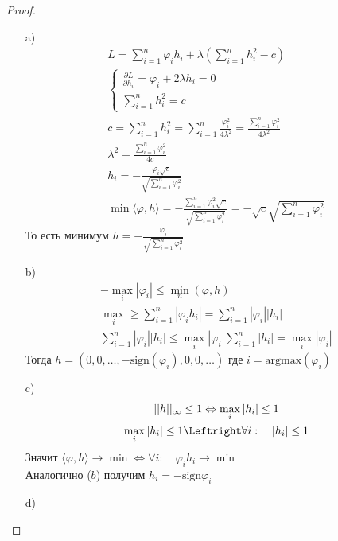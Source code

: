 \begin{proof}
\begin{itemize}
        \item[a)]
            \begin{gather*}
                L = \sum\limits_{i = 1}^{n} \varphi_i h_i + \lambda(\sum\limits_{i = 1}^{n} h_i^2 - c)\\
                \begin{cases}
                    \frac{\partial L}{\partial h_i} = \varphi_i + 2 \lambda h_i = 0\\
                    \sum\limits_{i = 1}^{n} h_i^2 = c
                \end{cases}\\
                c = \sum\limits_{i = 1}^{n} h_i^2
                = \sum\limits_{i = 1}^{n} \frac{\varphi_i^2}{4 \lambda^2}
                = \frac{\sum\limits_{i = 1}^{n} \varphi_i^2}{4 \lambda^2}\\
                \lambda^2 = \frac{\sum\limits_{i = 1}^{n} \varphi_i^2}{4 c}\\
                h_i = -\frac{\varphi_i \sqrt{c}}{\sqrt{\sum\limits_{i = 1}^{n} \varphi_i^2}}\\
                \min \langle \varphi, h \rangle
                = -\frac{\sum\limits_{i=1}^{n}\varphi_i^2 \sqrt{c}}{\sqrt{\sum\limits_{i = 1}^{n} \varphi_i^2}}
                = -\sqrt{c} \sqrt{\sum\limits_{i = 1}^{n} \varphi_i^2}
            \end{gather*}
            То есть минимум $h = -\frac{\varphi_i}{\sqrt{\sum\limits_{i = 1}^{n} \varphi_i^2}}$
        \item[b)]
            \begin{gather*}
                -\max_{i}|\varphi_i| \leq \min_{n}(\varphi, h)\\
                \max_{i} \geq \sum\limits_{i=1}^{n} |\varphi_i h_i|
                = \sum\limits_{i=1}^{n} |\varphi_i||h_i|\\
                \sum\limits_{i=1}^{n} |\varphi_i||h_i|
                \leq \max_{i} |\varphi_i| \sum\limits_{i=1}^{n} |h_i|
                = \max_{i} |\varphi_i|
            \end{gather*}
            Тогда $h = (0,0, \ldots, -\text{sign}(\varphi_i), 0, 0, \ldots)$ где $i = \text{argmax}(\varphi_i)$
        \item[c)] 
            \begin{gather*}
                ||h||_{\infty} \leq 1 \Leftrightarrow \max_{i} |h_i| \leq 1\\
                \max_{i} |h_i| \leq 1 \Leftright \forall i:\quad |h_i| \leq 1
            \end{gather*}
            Значит $\langle \varphi, h \rangle \to \min \Leftrightarrow \forall i:\quad \varphi_i h_i \to \min$\\
            Аналогично ($b$) получим $h_i = -\text{sign} \varphi_i$

        \item[d)] 
    \end{itemize}
\end{proof}
\vskip 0.4in





